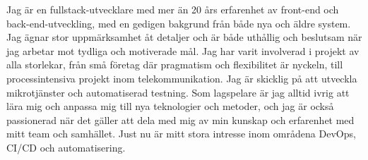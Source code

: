 \documentclass{cv-stylish}
\begin{document}
\begin{center} %



\vspace{1.0cm} %



\begin{adjustwidth}{1cm}{1cm}


Jag är en fullstack-utvecklare med mer än 20 års erfarenhet av
front-end och back-end-utveckling, med en gedigen bakgrund
från både nya och äldre system. Jag ägnar stor uppmärksamhet åt
detaljer och är både uthållig och beslutsam när jag arbetar mot
tydliga och motiverade mål. Jag har varit involverad i projekt av
alla storlekar, från små företag där pragmatism och flexibilitet
är nyckeln, till processintensiva projekt inom telekommunikation.
Jag är skicklig på att utveckla mikrotjänster och automatiserad
testning. Som lagspelare är jag alltid ivrig att lära mig och
anpassa mig till nya teknologier och metoder, och jag är också
passionerad när det gäller att dela med mig av min kunskap och
erfarenhet med mitt team och samhället. Just nu är mitt stora
intresse inom områdena DevOps, CI/CD och automatisering.




\end{adjustwidth}
\end{center}
\end{document}
